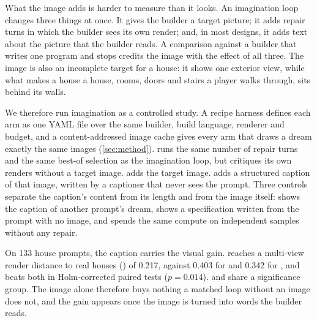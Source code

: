 What the image adds is harder to measure than it looks. An imagination loop changes three
things at once. It gives the builder a target picture; it adds repair turns in which the builder
sees its own render; and, in most designs, it adds text about the picture that the builder reads.
A comparison against a builder that writes one program and stops credits the image with the
effect of all three. The image is also an incomplete target for a house: it shows one exterior
view, while what makes a house a house, rooms, doors and stairs a player walks through, sits
behind its walls.

We therefore run imagination as a controlled study. A recipe harness defines each arm as one
YAML file over the same builder, build language, renderer and budget, and a content-addressed
image cache gives every arm that draws a dream exactly the same images (\cref{sec:method}).
\classicm{} runs the same number of repair turns and the same best-of selection as the
imagination loop, but critiques its own renders without a target image. \dream{} adds the target
image. \dreamcap{} adds a structured caption of that image, written by a captioner that never sees
the prompt. Three controls separate the caption's content from its length and from the image
itself: \shufcap{} shows the caption of another prompt's dream, \textspec{} shows a specification
written from the prompt with no image, and \bestoffour{} spends the same compute on independent
samples without any repair.

On 133 house prompts, the caption carries the visual gain. \dreamcap{} reaches a multi-view
render distance to real houses (\mvkid{}) of 0.217, against 0.403 for \classicm{} and 0.342 for
\dream{}, and beats both in Holm-corrected paired tests ($p=0.014$). \dream{} and \classicm{} share
a significance group. The image alone therefore buys nothing a matched loop without an image
does not, and the gain appears once the image is turned into words the builder reads.

